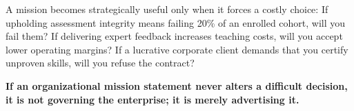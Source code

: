 A mission becomes strategically useful only when it forces a costly choice: If upholding assessment integrity means failing 20\% of an enrolled cohort, will you fail them? If delivering expert feedback increases teaching costs, will you accept lower operating margins? If a lucrative corporate client demands that you certify unproven skills, will you refuse the contract?

\textbf{If an organizational mission statement never alters a difficult decision, it is not governing the enterprise; it is merely advertising it.}
